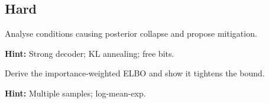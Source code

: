 \subsection*{Hard}

\begin{problem}
Analyse conditions causing posterior collapse and propose mitigation.

\textbf{Hint:} Strong decoder; KL annealing; free bits.
\end{problem}

\begin{problem}
Derive the importance-weighted ELBO and show it tightens the bound.

\textbf{Hint:} Multiple samples; log-mean-exp.
\end{problem}

